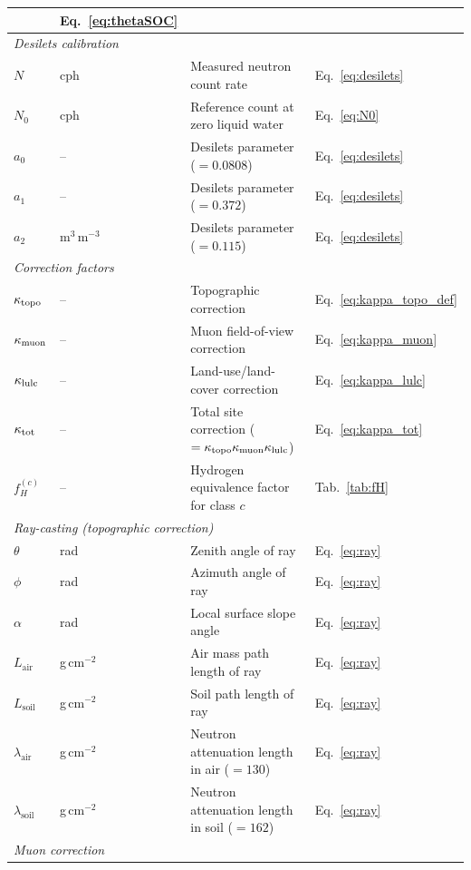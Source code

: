 \begin{table}[H]
\begin{tabularx}{\linewidth}{llXl}
                 & Eq.~\eqref{eq:thetaSOC} \\
\midrule
\multicolumn{4}{l}{\textit{Desilets calibration}} \\
$N$        & cph & Measured neutron count rate & Eq.~\eqref{eq:desilets} \\
$N_0$      & cph & Reference count at zero liquid water
                 & Eq.~\eqref{eq:N0} \\
$a_0$      & -- & Desilets parameter ($= 0.0808$) & Eq.~\eqref{eq:desilets} \\
$a_1$      & -- & Desilets parameter ($= 0.372$)  & Eq.~\eqref{eq:desilets} \\
$a_2$      & m$^3$\,m$^{-3}$ & Desilets parameter ($= 0.115$)
                 & Eq.~\eqref{eq:desilets} \\
\midrule
\multicolumn{4}{l}{\textit{Correction factors}} \\
$\kappa_\mathrm{topo}$      & -- & Topographic correction & Eq.~\eqref{eq:kappa_topo_def} \\
$\kappa_\mathrm{muon}$      & -- & Muon field-of-view correction & Eq.~\eqref{eq:kappa_muon} \\
$\kappa_\mathrm{lulc}$      & -- & Land-use/land-cover correction & Eq.~\eqref{eq:kappa_lulc} \\
$\kappa_\mathrm{tot}$    & -- & Total site correction ($= \kappa_\mathrm{topo}\kappa_\mathrm{muon}\kappa_\mathrm{lulc}$) & Eq.~\eqref{eq:kappa_tot} \\
$f_H^{(c)}$ & -- & Hydrogen equivalence factor for class $c$ & Tab.~\ref{tab:fH} \\
\midrule
\multicolumn{4}{l}{\textit{Ray-casting (topographic correction)}} \\
$\theta$   & rad & Zenith angle of ray & Eq.~\eqref{eq:ray} \\
$\phi$     & rad & Azimuth angle of ray & Eq.~\eqref{eq:ray} \\
$\alpha$   & rad & Local surface slope angle & Eq.~\eqref{eq:ray} \\
$L_\mathrm{air}$ & g\,cm$^{-2}$ & Air mass path length of ray & Eq.~\eqref{eq:ray} \\
$L_\mathrm{soil}$ & g\,cm$^{-2}$ & Soil path length of ray & Eq.~\eqref{eq:ray} \\
$\lambda_\mathrm{air}$ & g\,cm$^{-2}$ & Neutron attenuation length in air ($= 130$) & Eq.~\eqref{eq:ray} \\
$\lambda_\mathrm{soil}$ & g\,cm$^{-2}$ & Neutron attenuation length in soil ($= 162$) & Eq.~\eqref{eq:ray} \\
\midrule
\multicolumn{4}{l}{\textit{Muon correction}} \\

\end{tabularx}
\end{table}
